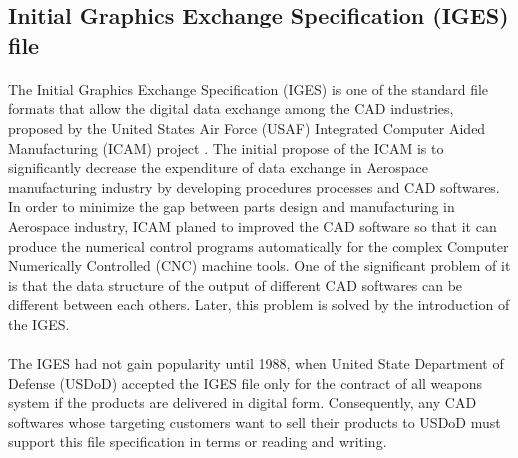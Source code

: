 \subsection{Initial Graphics Exchange Specification (IGES) file}
\label{lr_sec:IGES}
\paragraph{}
The Initial Graphics Exchange Specification (IGES) is one of the standard file formats that allow the digital data exchange among the CAD industries, proposed by the United States Air Force (USAF) Integrated Computer Aided Manufacturing (ICAM) project \citep{uspro2006}.
The initial propose of the ICAM is to significantly decrease the expenditure of data exchange in Aerospace manufacturing industry by developing procedures processes and CAD softwares.
In order to minimize the gap between parts design and manufacturing in Aerospace industry, ICAM planed to improved the CAD software so that it can produce the numerical control programs automatically for the complex Computer Numerically Controlled (CNC) machine tools.
One of the significant problem of it is that the data structure of the output of different CAD softwares can be different between each others.
Later, this problem is solved by the introduction of the IGES.
\paragraph{}
The IGES had not gain popularity until 1988, when United State Department of Defense (USDoD) accepted the IGES file only for the contract of all weapons system if the products are delivered in digital form.
Consequently, any CAD softwares whose targeting customers want to sell their products to USDoD must support this file specification in terms or reading and writing.


